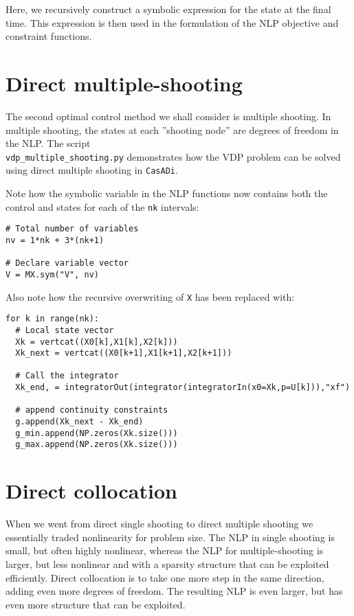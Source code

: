 \documentclass[a4paper,12pt]{book}
\newcommand{\CasADi}{\texttt{CasADi}\xspace}
\begin{document}
Here, we recursively construct a symbolic expression for the state at the final time. This expression is then used in the formulation of the NLP objective and constraint functions.

\section{Direct multiple-shooting}
The second optimal control method we shall consider is multiple shooting. In multiple shooting, the states at each ''shooting node'' are degrees of freedom in the NLP. The script \\ \texttt{vdp\_multiple\_shooting.py} demonstrates how the VDP problem can be solved using direct multiple shooting in \CasADi.

Note how the symbolic variable in the NLP functions now contains both the control and states for each of the \texttt{nk} intervals:
\begin{verbatim}
# Total number of variables
nv = 1*nk + 3*(nk+1)

# Declare variable vector
V = MX.sym("V", nv)
\end{verbatim}

Also note how the recursive overwriting of \texttt{X} has been replaced with:
\begin{verbatim}
for k in range(nk):
  # Local state vector
  Xk = vertcat((X0[k],X1[k],X2[k]))
  Xk_next = vertcat((X0[k+1],X1[k+1],X2[k+1]))
  
  # Call the integrator
  Xk_end, = integratorOut(integrator(integratorIn(x0=Xk,p=U[k])),"xf")
  
  # append continuity constraints
  g.append(Xk_next - Xk_end)
  g_min.append(NP.zeros(Xk.size()))
  g_max.append(NP.zeros(Xk.size()))
\end{verbatim}

\section{Direct collocation}
When we went from direct single shooting to direct multiple shooting we essentially traded nonlinearity for problem size. The NLP in single shooting is small, but often highly nonlinear, whereas the NLP for multiple-shooting is larger, but less nonlinear and with a sparsity structure that can be exploited efficiently. Direct collocation is to take one more step in the same direction, adding even more degrees of freedom. The resulting NLP is even larger, but has even more structure that can be exploited.
\end{document}
